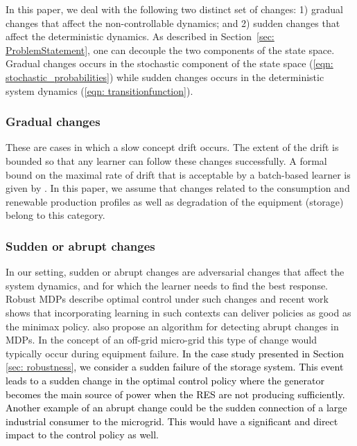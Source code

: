 \documentclass{article}
\newcommand{\ubar}[1]{\text{\b{$#1$}}}
\begin{document}
	In this paper, we deal with the following two distinct set of changes: 1) gradual changes that affect the non-controllable dynamics; and 2) sudden changes that affect the deterministic dynamics.
	As described in Section~\ref{sec: ProblemStatement}, one can decouple the two components of the state space. Gradual changes occurs in the stochastic component of the state space (\ref{eqn: stochastic_probabilities}) while sudden changes occurs in the deterministic system dynamics (\ref{eqn: transitionfunction}).
	
	

	\subsubsection{Gradual changes}
	These are cases in which a slow concept drift occurs. The extent of the drift is bounded so that any learner can follow these changes successfully. A formal bound on the maximal rate of drift that is acceptable by a batch-based learner is given by \citet{kuh1991learning}. In this paper, we assume that changes related to the consumption and renewable production profiles as well as degradation of the equipment (storage) belong to this category.
	
	\subsubsection{Sudden or abrupt changes}
	In our setting, sudden or abrupt changes are adversarial changes that affect the system dynamics, and for which the learner needs to find the best response. Robust MDPs \cite{nilim2005robust} describe optimal control under such changes and recent work \cite{lim2013reinforcement} shows that incorporating learning in such contexts can deliver policies as good as the minimax policy. \citet{gajane2018ucrl} also propose an algorithm for detecting abrupt changes in MDPs. In the concept of an off-grid micro-grid this type of change would typically occur during equipment failure. \textcolor{black}{In the case study presented in Section \ref{sec: robustness}, we consider a sudden failure of the storage system. This event leads to a sudden change in the optimal control policy where the generator becomes the main source of power when the RES are not producing sufficiently. Another example of an abrupt change could be the sudden connection of a large industrial consumer to the microgrid. This would have a significant and direct impact to the control policy as well.} 
\end{document}
